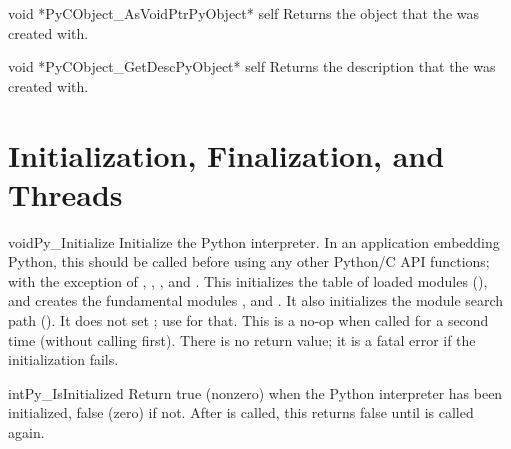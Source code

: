 \documentclass{manual}
\begin{document}
\begin{cfuncdesc}{void *}{PyCObject_AsVoidPtr}{PyObject* self}
Returns the object  that the  
was created with.
\end{cfuncdesc}

\begin{cfuncdesc}{void *}{PyCObject_GetDesc}{PyObject* self}
Returns the description  that the 
 was created with.
\end{cfuncdesc}

\chapter{Initialization, Finalization, and Threads
         \label{initialization}}

\begin{cfuncdesc}{void}{Py_Initialize}{}
Initialize the Python interpreter.  In an application embedding 
Python, this should be called before using any other Python/C API 
functions; with the exception of ,
, ,
and .  This initializes the table of
loaded modules (), and creates the fundamental
modules ,
 and
.  It also initializes the module
search path ().%
It does not set ; use  for
that.  This is a no-op when called for a second time (without calling
 first).  There is no return value; it is a
fatal error if the initialization fails.
\end{cfuncdesc}

\begin{cfuncdesc}{int}{Py_IsInitialized}{}
Return true (nonzero) when the Python interpreter has been
initialized, false (zero) if not.  After  is
called, this returns false until  is called
again.
\end{cfuncdesc}
\end{document}
